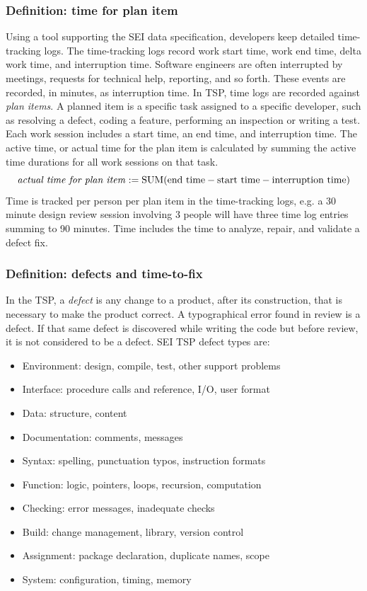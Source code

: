 \documentclass[smallcondensed]{svjour3}
\newcommand{\bi}{\begin{itemize}}%
\newcommand{\ei}{\end{itemize}}
\begin{document}
\subsubsection{Definition: time for plan item}

Using a tool supporting the SEI data specification, developers keep detailed time-tracking logs. The time-tracking logs record  work start time, work end time,  delta
work time, and interruption time. Software engineers are often
interrupted by meetings, requests for technical help, reporting, and
so forth. These events are recorded, in minutes, as interruption
time. In TSP, time logs are recorded against \textit{plan items}. A planned item is a specific task assigned to a specific developer, such as resolving a defect, coding a feature, performing an inspection or writing a test. Each  work session includes a start time, an end time, and interruption time. The active time, or actual time for the plan item is calculated by summing the active time durations for all work sessions on that task.
\[
\text{\emph{actual time for plan item}} := \text{SUM(}\text{end time} - \text{start time} - \text{interruption time}) 
\]
Time is tracked per person per plan item in the time-tracking logs, e.g. a 30 minute design review session involving 3 people will have three time log entries summing to 90 minutes. Time includes the time to analyze, repair, and validate a defect fix.



\subsubsection{Definition: defects and time-to-fix}\label{sect:defin}
In the TSP, a  \emph{defect} is any change to a product, after its construction, that is necessary to make the product correct.  A typographical error found in review is a defect. If that same defect is discovered while writing the code but before review, it is not considered to be a defect. 
SEI TSP defect types are:
\bi
\item Environment: design, compile, test,  other support  problems
\item Interface: procedure calls and reference, I/O, user format
\item Data: structure, content
\item Documentation: comments, messages
\item Syntax: spelling, punctuation typos, instruction formats
\item Function: logic, pointers, loops, recursion, computation  
\item Checking: error messages, inadequate checks
\item Build: change management, library, version control
\item Assignment: package
declaration, duplicate names, scope
\item System: configuration, timing, memory
\ei
\end{document}
